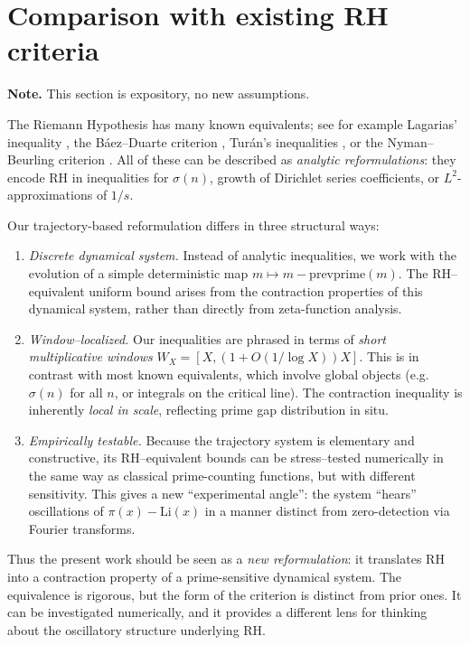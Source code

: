 \documentclass[11pt]{article}
\theoremstyle{plain}
\theoremstyle{definition}
\theoremstyle{remark}
\begin{document}
\section{Comparison with existing RH criteria}\label{sec:comparison}
\noindent\textbf{Note.} This section is expository, no new assumptions.

The Riemann Hypothesis has many known equivalents; see for example
Lagarias' inequality \cite{Lagarias2002}, the Báez--Duarte criterion
\cite{BaezDuarte2005}, Turán's inequalities \cite{Turan1950}, or the
Nyman--Beurling criterion \cite{Nyman1950,Beurling1955}. 
All of these can be described as \emph{analytic reformulations}: 
they encode RH in inequalities for $\sigma(n)$, growth of Dirichlet
series coefficients, or $L^2$-approximations of $1/s$.

Our trajectory-based reformulation differs in three structural ways:

\begin{enumerate}
\item \emph{Discrete dynamical system.}  
Instead of analytic inequalities, we work with the evolution of
a simple deterministic map $m\mapsto m-\mathrm{prevprime}(m)$.
The RH--equivalent uniform bound arises from the contraction
properties of this dynamical system, rather than directly from
zeta-function analysis.

\item \emph{Window--localized.}  
Our inequalities are phrased in terms of \emph{short multiplicative
windows} $W_X=[X,(1+O(1/\log X))X]$. This is in contrast with most
known equivalents, which involve global objects (e.g.\ $\sigma(n)$
for all $n$, or integrals on the critical line). The contraction
inequality is inherently \emph{local in scale}, reflecting prime gap
distribution in situ.

\item \emph{Empirically testable.}  
Because the trajectory system is elementary and constructive,
its RH--equivalent bounds can be stress--tested numerically
in the same way as classical prime-counting functions, but with
different sensitivity. This gives a new “experimental angle”:
the system “hears” oscillations of $\pi(x)-\mathrm{Li}(x)$ in a
manner distinct from zero-detection via Fourier transforms.
\end{enumerate}

Thus the present work should be seen as a \emph{new reformulation}:
it translates RH into a contraction property of a prime-sensitive
dynamical system. The equivalence is rigorous, but the form of the
criterion is distinct from prior ones. It can be investigated
numerically, and it provides a different lens for thinking about
the oscillatory structure underlying RH.
\end{document}
